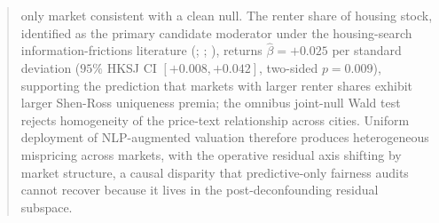 \begin{abstract}
only market consistent with a clean null. The renter share of
housing stock, identified as the primary candidate moderator
under the housing-search information-frictions literature
(\citealt{stigler1961economics}; \citealt{genesove1997equity};
\citealt{anenberg2020housing}), returns
$\hat\beta = +0.025$ per standard deviation ($95\%$ HKSJ CI
$[+0.008, +0.042]$, two-sided $p = 0.009$), supporting the prediction
that markets with larger renter shares exhibit larger Shen-Ross
uniqueness premia; the omnibus joint-null Wald test rejects homogeneity
of the price-text relationship across cities. Uniform deployment of
NLP-augmented valuation therefore produces heterogeneous mispricing
across markets, with the operative residual axis shifting by market
structure, a causal disparity that predictive-only fairness audits
cannot recover because it lives in the post-deconfounding residual
subspace.

\end{abstract}
